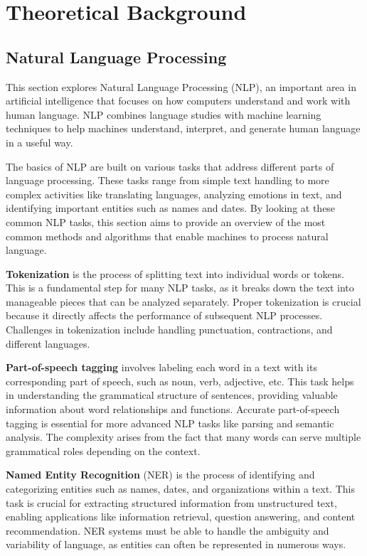 \chapter{Theoretical Background}

\label{chap:ch2}
\section{Natural Language Processing}

\quad This section explores Natural Language Processing (NLP), an important area in artificial intelligence that focuses on how computers understand and work with human language. NLP combines language studies with machine learning techniques to help machines understand, interpret, and generate human language in a useful way.

The basics of NLP are built on various tasks that address different parts of language processing. These tasks range from simple text handling to more complex activities like translating languages, analyzing emotions in text, and identifying important entities such as names and dates. By looking at these common NLP tasks, this section aims to provide an overview of the most common methods and algorithms that enable machines to process natural language.

\textbf{Tokenization} is the process of splitting text into individual words or tokens. This is a fundamental step for many NLP tasks, as it breaks down the text into manageable pieces that can be analyzed separately. Proper tokenization is crucial because it directly affects the performance of subsequent NLP processes. Challenges in tokenization include handling punctuation, contractions, and different languages.

\textbf{Part-of-speech tagging} involves labeling each word in a text with its corresponding part of speech, such as noun, verb, adjective, etc. This task helps in understanding the grammatical structure of sentences, providing valuable information about word relationships and functions. Accurate part-of-speech tagging is essential for more advanced NLP tasks like parsing and semantic analysis. The complexity arises from the fact that many words can serve multiple grammatical roles depending on the context.

\textbf{Named Entity Recognition} (NER) is the process of identifying and categorizing entities such as names, dates, and organizations within a text. This task is crucial for extracting structured information from unstructured text, enabling applications like information retrieval, question answering, and content recommendation. NER systems must be able to handle the ambiguity and variability of language, as entities can often be represented in numerous ways.


